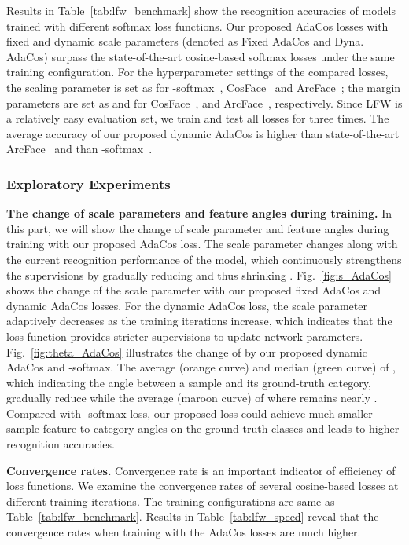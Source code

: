 \documentclass[10pt,twocolumn,letterpaper]{article}
\begin{document}
Results in Table~\ref{tab:lfw_benchmark} show the recognition accuracies of models trained with different softmax loss functions. Our proposed AdaCos losses with fixed and dynamic scale parameters (denoted as Fixed AdaCos and Dyna. AdaCos) surpass the state-of-the-art cosine-based softmax losses under the same training configuration. For the hyperparameter settings of the compared losses, the scaling parameter is set as  for -softmax~\cite{L2-softmax}, CosFace~\cite{CosFace} and ArcFace~\cite{ArcFace}; the margin parameters are set as  and  for CosFace~\cite{CosFace}, and ArcFace~\cite{ArcFace}, respectively. Since LFW is a relatively easy evaluation set, we train and test all losses for three times. The average accuracy of our proposed dynamic AdaCos is  higher than state-of-the-art ArcFace~\cite{ArcFace} and  than -softmax~\cite{L2-softmax}.



\subsubsection{Exploratory Experiments}
{\bf\quad The change of scale parameters and feature angles during training.}
In this part, we will show the change of scale parameter  and feature angles  during training with our proposed AdaCos loss. 
The scale parameter  changes along with the current recognition performance of the model, which continuously strengthens the supervisions by gradually reducing  and thus shrinking .
Fig.~\ref{fig:s_AdaCos} shows the change of the scale parameter  with our proposed fixed AdaCos and dynamic AdaCos losses. For the dynamic AdaCos loss, the scale parameter  adaptively decreases as the training iterations increase, which indicates that the loss function provides stricter supervisions to update network parameters.
Fig.~\ref{fig:theta_AdaCos} illustrates the change of  by our proposed dynamic AdaCos and -softmax. The average (orange curve) and median (green curve) of , which indicating the angle between a sample and its ground-truth category, gradually reduce while the average (maroon curve) of  where  remains nearly . Compared with -softmax loss, our proposed loss could achieve much smaller sample feature to category angles on the ground-truth classes and leads to higher recognition accuracies.


{\bf Convergence rates.}
Convergence rate is an important indicator of efficiency of loss functions. We examine the convergence rates of several cosine-based losses at different training iterations. The training configurations are same as Table~\ref{tab:lfw_benchmark}. Results in Table~\ref{tab:lfw_speed} reveal that the convergence rates when training with the AdaCos losses are much higher.
\end{document}
